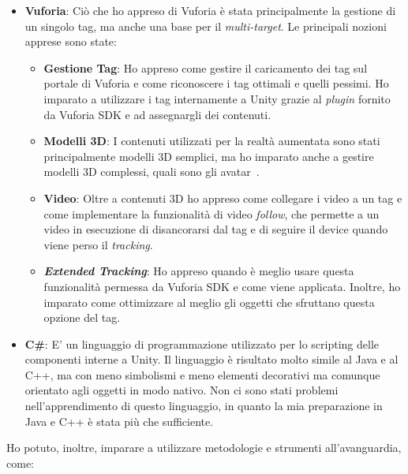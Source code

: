 \begin{itemize}
	\item \textbf{Vuforia}: Ci\`o che ho appreso di Vuforia \`e stata principalmente la gestione di un singolo tag, ma anche una base per il \textit{multi-target}. Le principali nozioni apprese sono state:
	\begin{itemize}
		\item \textbf{Gestione Tag}: Ho appreso come gestire il caricamento dei tag sul portale di Vuforia e come riconoscere i tag ottimali e quelli pessimi. Ho imparato a utilizzare i tag internamente a Unity grazie al \textit{plugin} fornito da Vuforia SDK e ad assegnargli dei contenuti.
		
		\item \textbf{Modelli 3D}: I contenuti utilizzati per la realt\`a aumentata sono stati principalmente modelli 3D semplici, ma ho imparato anche a gestire modelli 3D complessi, quali sono gli avatar\gloss\ .
		
		\item \textbf{Video}: Oltre a contenuti 3D ho appreso come collegare i video a un tag e come implementare la funzionalit\`a di video \textit{follow}, che permette a un video in esecuzione di disancorarsi dal tag e di seguire il device quando viene perso il \textit{tracking}.
		
		\item \textbf{\textit{Extended Tracking}}: Ho appreso quando \`e meglio usare questa funzionalit\`a permessa da Vuforia SDK e come viene applicata. Inoltre, ho imparato come ottimizzare al meglio gli oggetti che sfruttano questa opzione del tag.
	\end{itemize}
	
	\item \textbf{C\#}: E' un linguaggio di programmazione utilizzato per lo scripting delle componenti interne a Unity. Il linguaggio \`e risultato molto simile al Java e al C++, ma con meno simbolismi e meno elementi decorativi ma comunque orientato agli oggetti in modo nativo. Non ci sono stati problemi nell'apprendimento di questo linguaggio, in quanto la mia preparazione in Java e C++ \`e stata pi\`u che sufficiente.
\end{itemize}
\noindent
Ho potuto, inoltre, imparare a utilizzare metodologie e strumenti all'avanguardia, come:

